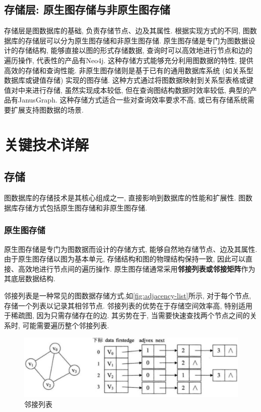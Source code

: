 \documentclass[12pt,hyperref,a4paper,UTF8]{ctexart}
\begin{document}
\subsection{存储层: 原生图存储与非原生图存储}

存储层是图数据库的基础, 负责存储节点、边及其属性. 根据实现方式的不同, 图数据库的存储层可以分为原生图存储和非原生图存储.
原生图存储是专门为图数据设计的存储结构, 能够直接以图的形式存储数据, 查询时可以高效地进行节点和边的遍历操作, 代表性的产品有Neo4j. 这种存储方式能够充分利用图数据的特性, 提供高效的存储和查询性能.
非原生图存储则是基于已有的通用数据库系统 (如关系型数据库或键值存储) 实现的图存储. 这种方式通过将图数据映射到关系型表格或键值对中来进行存储, 虽然实现成本较低, 但在查询图结构数据时效率较低, 典型的产品有JanusGraph. 这种存储方式适合一些对查询效率要求不高, 或已有存储系统需要扩展支持图数据的场景.

\section{关键技术详解}

\subsection{存储}

图数据库的存储技术是其核心组成之一, 直接影响到数据库的性能和扩展性. 图数据库存储方式包括原生图存储和非原生图存储.

\subsubsection*{原生图存储}

原生图存储是专门为图数据而设计的存储方式, 能够自然地存储节点、边及其属性. 由于原生图存储以图为基本单元, 存储结构和图的物理结构保持一致, 因此可以直接、高效地进行节点间的遍历操作. 原生图存储通常采用\textbf{邻接列表或邻接矩阵}作为其底层数据结构.

邻接列表是一种常见的图数据存储方式,如\autoref{fig:adjacency-list}所示, 对于每个节点, 存储一个列表以记录其相邻节点. 邻接列表的优势在于存储空间效率高, 特别适用于稀疏图, 因为只需存储存在的边. 其劣势在于, 当需要快速查找两个节点之间的关系时, 可能需要遍历整个邻接列表.
\begin{figure}[H]
	\centering
	\includegraphics[width=1\textwidth]{images/11.png}
	\caption{邻接列表}
	\label{fig:adjacency-list}
\end{figure}
\end{document}
